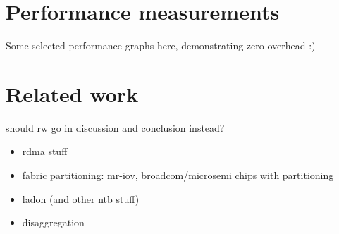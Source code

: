 
\section{Performance measurements}\label{sec:eval}
Some selected performance graphs here, demonstrating zero-overhead :)

\section{Related work}\label{sec:rw}
should rw go in discussion and conclusion instead?
\begin{itemize}
    \item rdma stuff
    \item fabric partitioning: mr-iov, broadcom/microsemi chips with partitioning
    \item ladon (and other ntb stuff)
    \item disaggregation
\end{itemize}

%
